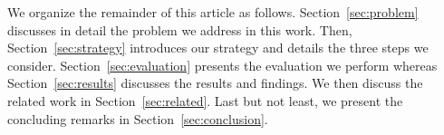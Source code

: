 We organize the remainder of this article as follows. Section~\ref{sec:problem} discusses in detail the problem we address in this work. Then, Section~\ref{sec:strategy} introduces our strategy and details the three steps we consider. Section~\ref{sec:evaluation} presents the evaluation we perform whereas Section~\ref{sec:results} discusses the results and findings. We then discuss the related work in Section~\ref{sec:related}. Last but not least, we present the concluding remarks in Section~\ref{sec:conclusion}.